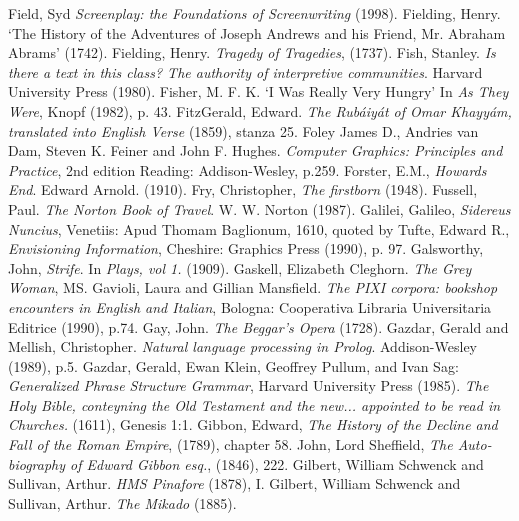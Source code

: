 \begin{bibitemlist}{1}
 Field, Syd \textit{Screenplay: the Foundations of Screenwriting} (1998).
 Fielding, Henry. ‘The History of the Adventures of Joseph Andrews and his Friend, Mr. Abraham Abrams’ (1742).
 Fielding, Henry. \textit{Tragedy of Tragedies}, (1737).
 Fish, Stanley. \textit{Is there a text in this class? The authority of interpretive communities}. Harvard University Press (1980).
 Fisher, M. F. K. ‘I Was Really Very Hungry’ In \textit{As They Were}, Knopf (1982), p. 43.
  FitzGerald, Edward. \textit{The Rubáiyát of Omar Khayyám, translated into English Verse} (1859), stanza 25.
 Foley James D., Andries van Dam, Steven K. Feiner and John F. Hughes. \textit{Computer Graphics: Principles and Practice}, 2nd edition  Reading: Addison-Wesley, p.259.
 Forster, E.M., \textit{Howards End}. Edward Arnold. (1910).
 Fry, Christopher, \textit{The firstborn} (1948).
 Fussell, Paul. \textit{The Norton Book of Travel}. W. W. Norton (1987).
 Galilei, Galileo, \textit{Sidereus Nuncius}, Venetiis: Apud Thomam Baglionum, 1610, quoted by Tufte, Edward R., \textit{Envisioning Information}, Cheshire: Graphics Press (1990), p. 97.
 Galsworthy, John, \textit{Strife}. In \textit{Plays, vol 1.} (1909). 
 Gaskell, Elizabeth Cleghorn. \textit{The Grey Woman}, MS.
 Gavioli, Laura and Gillian Mansfield. \textit{The PIXI corpora: bookshop encounters in English and Italian}, Bologna: Cooperativa Libraria Universitaria Editrice (1990), p.74.
 Gay, John. \textit{The Beggar's Opera} (1728).
 Gazdar, Gerald and Mellish, Christopher. \textit{Natural language processing in Prolog}. Addison-Wesley (1989), p.5.
 Gazdar, Gerald, Ewan Klein, Geoffrey Pullum, and Ivan Sag: \textit{Generalized Phrase Structure Grammar}, Harvard University Press (1985).
 \textit{The Holy Bible, conteyning the Old Testament and the new... appointed to be read in Churches.} (1611), Genesis 1:1.
 Gibbon, Edward, \textit{The History of the Decline and Fall of the Roman Empire}, (1789), chapter 58.
 John, Lord Sheffield, \textit{The Auto-biography of Edward Gibbon esq.}, (1846), 222.
 Gilbert, William Schwenck and Sullivan, Arthur. \textit{HMS Pinafore} (1878), I.
 Gilbert, William Schwenck and Sullivan, Arthur. \textit{The Mikado} (1885).

\end{bibitemlist}
